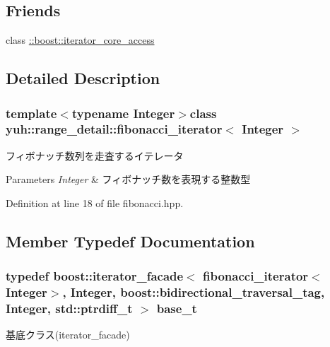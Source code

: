 \subsection*{\-Friends}
\begin{DoxyCompactItemize}
\item 
class \hyperlink{classyuh_1_1range__detail_1_1fibonacci__iterator_a986bf0deaa7559f361d03122eeea4c86}{\-::boost\-::iterator\-\_\-core\-\_\-access}
\end{DoxyCompactItemize}


\subsection{\-Detailed \-Description}
\subsubsection*{template$<$typename Integer$>$class yuh\-::range\-\_\-detail\-::fibonacci\-\_\-iterator$<$ Integer $>$}

フィボナッチ数列を走査するイテレータ 
\begin{DoxyParams}{\-Parameters}
{\em \-Integer} & フィボナッチ数を表現する整数型 \\
\hline
\end{DoxyParams}


\-Definition at line 18 of file fibonacci.\-hpp.



\subsection{\-Member \-Typedef \-Documentation}
\hypertarget{classyuh_1_1range__detail_1_1fibonacci__iterator_a81abbaeb18ba3b07e8a00e7e8d66979f}{
\subsubsection[{base\-\_\-t}]{\setlength{\rightskip}{0pt plus 5cm}typedef boost\-::iterator\-\_\-facade$<$ {\bf fibonacci\-\_\-iterator}$<$\-Integer$>$, \-Integer, boost\-::bidirectional\-\_\-traversal\-\_\-tag, \-Integer, std\-::ptrdiff\-\_\-t $>$ {\bf base\-\_\-t}}}\label{df/d65/classyuh_1_1range__detail_1_1fibonacci__iterator_a81abbaeb18ba3b07e8a00e7e8d66979f}
基底クラス(iterator\-\_\-facade) 

